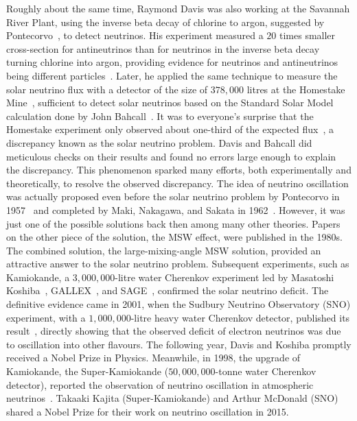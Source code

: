 Roughly about the same time, Raymond Davis was also working at the Savannah River Plant, using the inverse beta decay of chlorine to argon, suggested by Pontecorvo~\cite{Pontecorvo:1946mv}, to detect neutrinos.
His experiment measured a $20$ times smaller cross-section for antineutrinos than for neutrinos in the inverse beta decay turning chlorine into argon, providing evidence for neutrinos and antineutrinos being different particles~\cite{Davis:1959pba}.
Later, he applied the same technique to measure the solar neutrino flux with a detector of the size of $378,000$ litres at the Homestake Mine~\cite{Davis:1964zz}, sufficient to detect solar neutrinos based on the Standard Solar Model calculation done by John Bahcall~\cite{Bahcall:1964ya}.
It was to everyone's surprise that the Homestake experiment only observed about one-third of the expected flux~\cite{Davis:1968}, a discrepancy known as the solar neutrino problem.
Davis and Bahcall did meticulous checks on their results and found no errors large enough to explain the discrepancy.
This phenomenon sparked many efforts, both experimentally and theoretically, to resolve the observed discrepancy.
The idea of neutrino oscillation was actually proposed even before the solar neutrino problem by Pontecorvo in 1957~\cite{Pontecorvo:1957qd} and completed by Maki, Nakagawa, and Sakata in 1962~\cite{Maki:1962mu}.
However, it was just one of the possible solutions back then among many other theories.
Papers on the other piece of the solution, the MSW effect, were published in the 1980s.
The combined solution, the large-mixing-angle MSW solution, provided an attractive answer to the solar neutrino problem.
Subsequent experiments, such as Kamiokande, a $3,000,000$-litre water Cherenkov experiment led by Masatoshi Koshiba~\cite{Kamiokande-II:1989hkh}, GALLEX~\cite{GALLEX:1998kcz}, and SAGE~\cite{SAGE:1999nng}, confirmed the solar neutrino deficit.
The definitive evidence came in 2001, when the Sudbury Neutrino Observatory (SNO) experiment, with a $1,000,000$-litre heavy water Cherenkov detector, published its result~\cite{SNO:2001kpb}, directly showing that the observed deficit of electron neutrinos was due to oscillation into other flavours.
The following year, Davis and Koshiba promptly received a Nobel Prize in Physics.
Meanwhile, in 1998, the upgrade of Kamiokande, the Super-Kamiokande ($50,000,000$-tonne water Cherenkov detector), reported the observation of neutrino oscillation in atmospheric neutrinos~\cite{Super-Kamiokande:1998kpq}.
Takaaki Kajita (Super-Kamiokande) and Arthur McDonald (SNO) shared a Nobel Prize for their work on neutrino oscillation in 2015.

